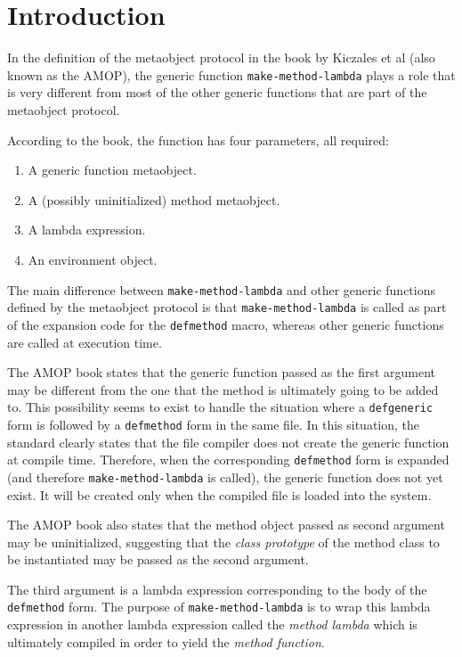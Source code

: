 \section{Introduction}

In the definition of the \commonlisp{} \cite{ansi:common:lisp}
metaobject protocol in the book by Kiczales et al
\cite{Kiczales:1991:AMP:574212} (also known as the AMOP), the generic
function \texttt{make-method-lambda} plays a role that is very
different from most of the other generic functions that are part of
the metaobject protocol.

According to the book, the function has four parameters, all required:

\begin{enumerate}
\item A generic function metaobject.
\item A (possibly uninitialized) method metaobject.
\item A lambda expression.
\item An environment object.
\end{enumerate}

The main difference between \texttt{make-method-lambda} and other
generic functions defined by the metaobject protocol is that
\texttt{make-method-lambda} is called as part of the expansion code
for the \texttt{defmethod} macro, whereas other generic functions are
called at execution time.

The AMOP book states that the generic function passed as the first
argument may be different from the one that the method is ultimately
going to be added to.  This possibility seems to exist to handle the
situation where a \texttt{defgeneric} form is followed by a
\texttt{defmethod} form in the same file.  In this situation, the
\commonlisp{} standard clearly states that the file compiler does not
create the generic function at compile time.  Therefore, when the
corresponding \texttt{defmethod} form is expanded (and therefore
\texttt{make-method-lambda} is called), the generic function does not
yet exist.  It will be created only when the compiled file is loaded
into the \commonlisp{} system.

The AMOP book also states that the method object passed as second
argument may be uninitialized, suggesting that the \emph{class
  prototype} of the method class to be instantiated may be passed as
the second argument.

The third argument is a lambda expression corresponding to the body of
the \texttt{defmethod} form.  The purpose of
\texttt{make-method-lambda} is to wrap this lambda expression in
another lambda expression called the \emph{method lambda} which is
ultimately compiled in order to yield the \emph{method function}.

